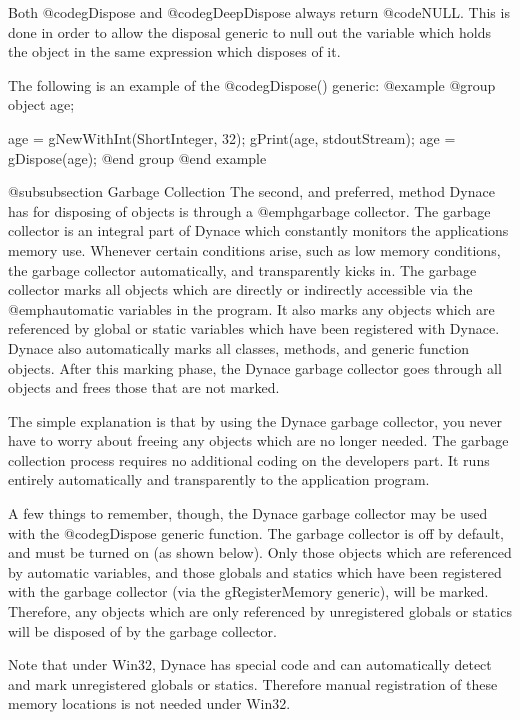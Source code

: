 Both @code{gDispose} and @code{gDeepDispose} always return @code{NULL}.
This is done in order to allow the disposal generic to null out the
variable which holds the object in the same expression which disposes
of it.

The following is an example of the @code{gDispose()} generic:
@example
@group
        object    age;

        age = gNewWithInt(ShortInteger, 32);
        gPrint(age, stdoutStream);
        age = gDispose(age);
@end group
@end example

@subsubsection Garbage Collection
The second, and preferred, method Dynace has for disposing of objects is
through a @emph{garbage collector}.  The garbage collector is an
integral part of Dynace which constantly monitors the applications memory
use.  Whenever certain conditions arise, such as low memory conditions,
the garbage collector automatically, and transparently kicks in.  The
garbage collector marks all objects which are directly or indirectly
accessible via the @emph{automatic} variables in the program.  It also
marks any objects which are referenced by global or static variables
which have been registered with Dynace.  Dynace also automatically marks all
classes, methods, and generic function objects.  After this marking
phase, the Dynace garbage collector goes through all objects and frees
those that are not marked.

The simple explanation is that by using the Dynace garbage collector, you
never have to worry about freeing any objects which are no longer
needed.  The garbage collection process requires no additional coding
on the developers part.  It runs entirely automatically and
transparently to the application program.

A few things to remember, though, the Dynace garbage collector may be used
with the @code{gDispose} generic function.  The garbage collector is off
by default, and must be turned on (as shown below).  Only those objects
which are referenced by automatic variables, and those globals and
statics which have been registered with the garbage collector (via the
gRegisterMemory generic), will be marked.  Therefore, any objects which
are only referenced by unregistered globals or statics will be disposed
of by the garbage collector.

Note that under Win32, Dynace has special code and can automatically
detect and mark unregistered globals or statics.  Therefore manual
registration of these memory locations is not needed under Win32.

